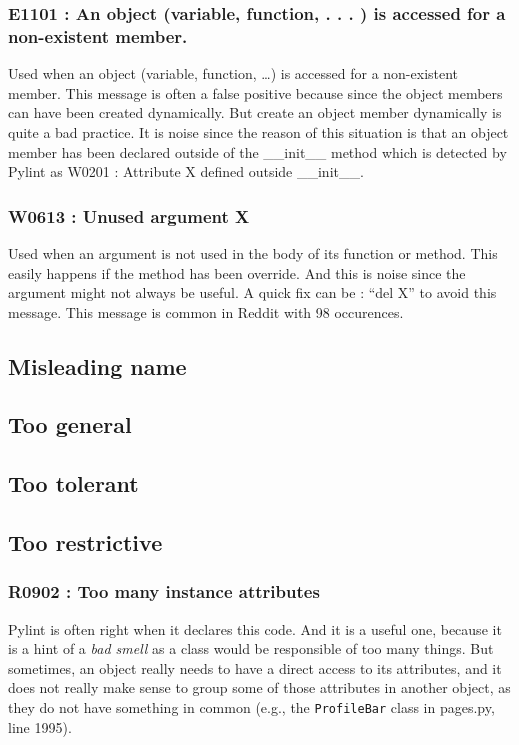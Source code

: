 \documentclass[11pt, a4paper]{article}
\newcommand{\tit}[1]{\textit{#1}}
\newcommand{\ttt}[1]{\texttt{#1}}
\newcommand{\pyl}{\textsf{Pylint}}
\begin{document}
\subsubsection*{E1101 : An object (variable, function, . . . ) is accessed for a non-existent member.}

Used when an object (variable, function, \dots{}) is accessed for a non-existent member.
This message is often a false positive because since the object members can have been created dynamically.
But create an object member dynamically is quite a bad practice.
It is noise since the reason of this situation is that an object member has been declared outside of the \_\_init\_\_ method which is detected by \pyl{} as W0201 : Attribute X defined outside \_\_init\_\_.

\subsubsection*{W0613 : Unused argument X}
Used when an argument is not used in the body of its function or method.
This easily happens if the method has been override.
And this is noise since the argument might not always be useful.
A quick fix can be : ``del X'' to avoid this message.
This message is common in Reddit with 98 occurences.

\subsection*{Misleading name}

\subsection*{Too general}

\subsection*{Too tolerant}

\subsection*{Too restrictive}

\subsubsection*{R0902 : Too many instance attributes}
\pyl{} is often right when it declares this code.
And it is a useful one, because it is a hint of a \tit{bad smell} as a class would be responsible of too many things.
But sometimes, an object really needs to have a direct access to its attributes, and it does not really make sense to group some of those attributes in another object, as they do not have something in common (e.g., the \ttt{ProfileBar} class in pages.py, line 1995).
\end{document}
